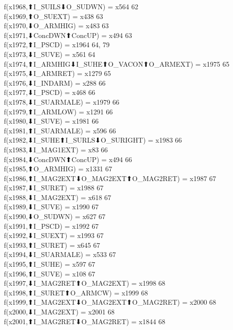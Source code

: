 f(x1968,⬆I_SUILS⬇O_SUDWN) = x564 {62} \\
f(x1969,⬆O_SUEXT) = x438 {63} \\
f(x1970,⬇O_ARMHIG) = x483 {63} \\
f(x1971,⬇ConcDWN⬆ConcUP) = x494 {63} \\
f(x1972,⬆I_PSCD) = x1964 {64, 79} \\
f(x1973,⬇I_SUVE) = x561 {64} \\
f(x1974,⬆I_ARMHIG⬇I_SUHE⬆O_VACON⬆O_ARMEXT) = x1975 {65} \\
f(x1975,⬇I_ARMRET) = x1279 {65} \\
f(x1976,⬇I_INDARM) = x288 {66} \\
f(x1977,⬇I_PSCD) = x468 {66} \\
f(x1978,⬇I_SUARMALE) = x1979 {66} \\
f(x1979,⬆I_ARMLOW) = x1291 {66} \\
f(x1980,⬇I_SUVE) = x1981 {66} \\
f(x1981,⬆I_SUARMALE) = x596 {66} \\
f(x1982,⬇I_SUHE⬆I_SURLS⬇O_SURIGHT) = x1983 {66} \\
f(x1983,⬇I_MAG1EXT) = x83 {66} \\
f(x1984,⬇ConcDWN⬆ConcUP) = x494 {66} \\
f(x1985,⬆O_ARMHIG) = x1331 {67} \\
f(x1986,⬆I_MAG2EXT⬇O_MAG2EXT⬆O_MAG2RET) = x1987 {67} \\
f(x1987,⬇I_SURET) = x1988 {67} \\
f(x1988,⬇I_MAG2EXT) = x618 {67} \\
f(x1989,⬇I_SUVE) = x1990 {67} \\
f(x1990,⬇O_SUDWN) = x627 {67} \\
f(x1991,⬆I_PSCD) = x1992 {67} \\
f(x1992,⬇I_SUEXT) = x1993 {67} \\
f(x1993,⬆I_SURET) = x645 {67} \\
f(x1994,⬇I_SUARMALE) = x533 {67} \\
f(x1995,⬆I_SUHE) = x597 {67} \\
f(x1996,⬆I_SUVE) = x108 {67} \\
f(x1997,⬇I_MAG2RET⬆O_MAG2EXT) = x1998 {68} \\
f(x1998,⬆I_SURET⬆O_ARMCW) = x1999 {68} \\
f(x1999,⬆I_MAG2EXT⬇O_MAG2EXT⬆O_MAG2RET) = x2000 {68} \\
f(x2000,⬇I_MAG2EXT) = x2001 {68} \\
f(x2001,⬆I_MAG2RET⬇O_MAG2RET) = x1844 {68} \\
